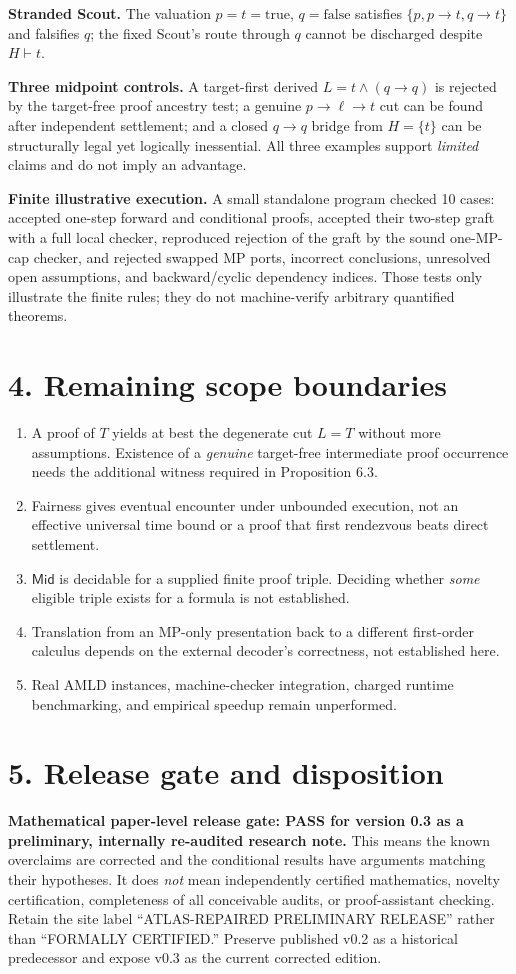 \documentclass[11pt,letterpaper]{article}
\begin{document}
\textbf{Stranded Scout.} The valuation $p=t=\mathrm{true}$, $q=\mathrm{false}$ satisfies $\{p,p\to t,q\to t\}$ and falsifies $q$; the fixed Scout's route through $q$ cannot be discharged despite $H\vdash t$.

\textbf{Three midpoint controls.} A target-first derived $L=t\land(q\to q)$ is rejected by the target-free proof ancestry test; a genuine $p\to\ell\to t$ cut can be found after independent settlement; and a closed $q\to q$ bridge from $H=\{t\}$ can be structurally legal yet logically inessential. All three examples support \emph{limited} claims and do not imply an advantage.

\textbf{Finite illustrative execution.} A small standalone program checked 10 cases: accepted one-step forward and conditional proofs, accepted their two-step graft with a full local checker, reproduced rejection of the graft by the sound one-MP-cap checker, and rejected swapped MP ports, incorrect conclusions, unresolved open assumptions, and backward/cyclic dependency indices. Those tests only illustrate the finite rules; they do not machine-verify arbitrary quantified theorems.
\section*{4. Remaining scope boundaries}
\begin{enumerate}[leftmargin=*,itemsep=2pt]
\item A proof of $T$ yields at best the degenerate cut $L=T$ without more assumptions. Existence of a \emph{genuine} target-free intermediate proof occurrence needs the additional witness required in Proposition 6.3.
\item Fairness gives eventual encounter under unbounded execution, not an effective universal time bound or a proof that first rendezvous beats direct settlement.
\item $\mathsf{Mid}$ is decidable for a supplied finite proof triple. Deciding whether \emph{some} eligible triple exists for a formula is not established.
\item Translation from an MP-only presentation back to a different first-order calculus depends on the external decoder's correctness, not established here.
\item Real AMLD instances, machine-checker integration, charged runtime benchmarking, and empirical speedup remain unperformed.
\end{enumerate}
\section*{5. Release gate and disposition}
\textbf{Mathematical paper-level release gate: PASS for version 0.3 as a preliminary, internally re-audited research note.} This means the known overclaims are corrected and the conditional results have arguments matching their hypotheses. It does \emph{not} mean independently certified mathematics, novelty certification, completeness of all conceivable audits, or proof-assistant checking. Retain the site label ``ATLAS-REPAIRED PRELIMINARY RELEASE'' rather than ``FORMALLY CERTIFIED.'' Preserve published v0.2 as a historical predecessor and expose v0.3 as the current corrected edition.
\end{document}
